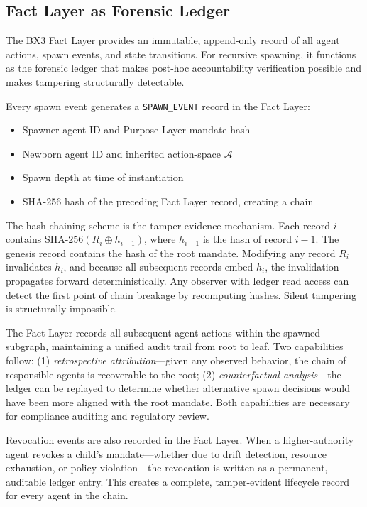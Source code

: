 \subsection{Fact Layer as Forensic Ledger}
\label{sec:fact-layer-ledger}

The BX3 Fact Layer provides an immutable, append-only record of all agent actions, spawn events, and state transitions. For recursive spawning, it functions as the forensic ledger that makes post-hoc accountability verification possible and makes tampering structurally detectable.

Every spawn event generates a \texttt{SPAWN\_EVENT} record in the Fact Layer:

\begin{itemize}
    \itemsep0em
    \item Spawner agent ID and Purpose Layer mandate hash
    \item Newborn agent ID and inherited action-space $\mathcal{A}$
    \item Spawn depth at time of instantiation
    \item SHA-256 hash of the preceding Fact Layer record, creating a chain
\end{itemize}

The hash-chaining scheme is the tamper-evidence mechanism. Each record $i$ contains $\text{SHA-256}(R_i \oplus h_{i-1})$, where $h_{i-1}$ is the hash of record $i-1$. The genesis record contains the hash of the root mandate. Modifying any record $R_i$ invalidates $h_i$, and because all subsequent records embed $h_i$, the invalidation propagates forward deterministically. Any observer with ledger read access can detect the first point of chain breakage by recomputing hashes. Silent tampering is structurally impossible.

The Fact Layer records all subsequent agent actions within the spawned subgraph, maintaining a unified audit trail from root to leaf. Two capabilities follow: (1) \emph{retrospective attribution}—given any observed behavior, the chain of responsible agents is recoverable to the root; (2) \emph{counterfactual analysis}—the ledger can be replayed to determine whether alternative spawn decisions would have been more aligned with the root mandate. Both capabilities are necessary for compliance auditing and regulatory review.

Revocation events are also recorded in the Fact Layer. When a higher-authority agent revokes a child's mandate—whether due to drift detection, resource exhaustion, or policy violation—the revocation is written as a permanent, auditable ledger entry. This creates a complete, tamper-evident lifecycle record for every agent in the chain.


